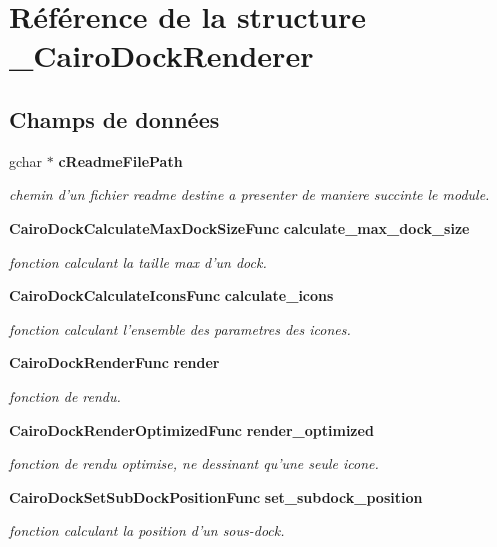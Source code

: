 \section{R\'{e}f\'{e}rence de la structure \_\-Cairo\-Dock\-Renderer}
\label{struct__CairoDockRenderer}
\subsection*{Champs de donn\'{e}es}
\begin{CompactItemize}
\item 
gchar $\ast$ {\bf c\-Readme\-File\-Path}
\begin{CompactList}\small\item\em chemin d'un fichier readme destine a presenter de maniere succinte le module. \item\end{CompactList}\item 
{\bf Cairo\-Dock\-Calculate\-Max\-Dock\-Size\-Func} {\bf calculate\_\-max\_\-dock\_\-size}
\begin{CompactList}\small\item\em fonction calculant la taille max d'un dock. \item\end{CompactList}\item 
{\bf Cairo\-Dock\-Calculate\-Icons\-Func} {\bf calculate\_\-icons}
\begin{CompactList}\small\item\em fonction calculant l'ensemble des parametres des icones. \item\end{CompactList}\item 
{\bf Cairo\-Dock\-Render\-Func} {\bf render}
\begin{CompactList}\small\item\em fonction de rendu. \item\end{CompactList}\item 
{\bf Cairo\-Dock\-Render\-Optimized\-Func} {\bf render\_\-optimized}
\begin{CompactList}\small\item\em fonction de rendu optimise, ne dessinant qu'une seule icone. \item\end{CompactList}\item 
{\bf Cairo\-Dock\-Set\-Sub\-Dock\-Position\-Func} {\bf set\_\-subdock\_\-position}
\begin{CompactList}\small\item\em fonction calculant la position d'un sous-dock. \item\end{CompactList}\item 

\end{CompactItemize}
